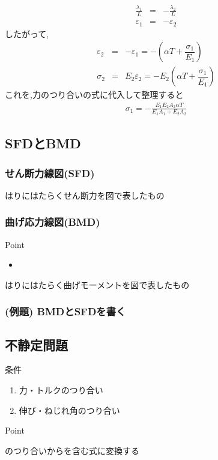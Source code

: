 \documentclass[a4paper]{jsarticle}
\begin{document}
\begin{enumerate}[(1)]
          \begin{eqnarray*}
              \frac{\lambda_1}{L}&=&-\frac{\lambda_2}{L}\\
              \varepsilon_1&=&-\varepsilon_2
          \end{eqnarray*}
          したがって,
          \begin{eqnarray*}
              \varepsilon_2&=&-\varepsilon_1=-\left(\alpha T+\dfrac{\sigma_1}{E_1}\right)\\
              \sigma_2&=&E_2\varepsilon_2=-E_2\left(\alpha T+\dfrac{\sigma_1}{E_1}\right)
          \end{eqnarray*}
          これを,力のつり合いの式に代入して整理すると
          \begin{eqnarray*}
              \sigma_1=-\frac{E_1E_2A_2\alpha T}{E_1A_1+E_2A_2}
          \end{eqnarray*}
\end{enumerate}
\subsection{SFDとBMD}
\subsubsection{せん断力線図(SFD)}
はりにはたらくせん断力を図で表したもの
\subsubsection{曲げ応力線図(BMD)}
\begin{itembox}[l]{Point}
    \begin{itemize}
        \item
    \end{itemize}
\end{itembox}
はりにはたらく曲げモーメントを図で表したもの
\subsubsection{(例題) BMDとSFDを書く}

\subsection{不静定問題}
\begin{itembox}[l]{条件}
    \begin{enumerate}[(1)]
        \item 力・トルクのつり合い
        \item 伸び・ねじれ角のつり合い
    \end{enumerate}
\end{itembox}
\begin{itembox}[l]{Point}
    \begin{center}
        のつり合いからを含む式に変換する
    \end{center}
\end{itembox}
\end{document}
